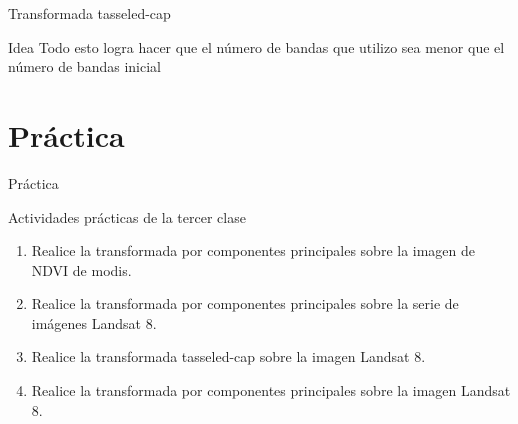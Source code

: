 \documentclass[]{beamer}
\begin{document}
\begin{frame}{Transformada tasseled-cap}
  \begin{block}{Idea}
    Todo esto logra hacer que el número de bandas que utilizo sea menor que el
      número de bandas inicial
  \end{block}
\end{frame}
\section{Práctica}

\begin{frame}{Práctica}
  \begin{exampleblock}{Actividades prácticas de la tercer clase}
    \begin{enumerate}
        \item Realice la transformada por componentes principales sobre la
            imagen de NDVI de modis.
        \item Realice la transformada por componentes principales sobre la
            serie de imágenes Landsat 8.
        \item Realice la transformada tasseled-cap sobre la imagen Landsat 8.
        \item Realice la transformada por componentes principales sobre la
            imagen Landsat 8.
    \end{enumerate}
  \end{exampleblock}
\end{frame}
\end{document}
